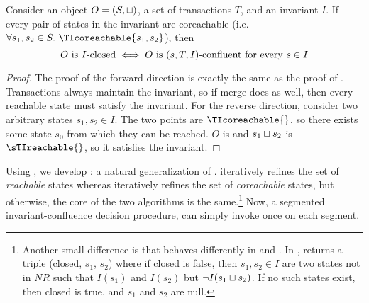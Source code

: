 \begin{theorem}
  Consider an object $O = (S, \sqcup)$, a set of transactions $T$, and an
  invariant $I$. If every pair of states in the invariant are coreachable (i.e.
  $\forall s_1, s_2 \in S.\ \TIcoreachable{s_1, s_2}$), then
  \[
    \text{$O$ is $I$-closed{}}
    \iff
    \text{$O$ is $(s, T, I)$-confluent for every $s \in I$}
  \]
\end{theorem}
\begin{proof}
  The proof of the forward direction is exactly the same as the proof of
  . Transactions always maintain the
  invariant, so if merge does as well, then every reachable state must satisfy
  the invariant.
  For the reverse direction, consider two arbitrary states $s_1, s_2 \in I$.
  The two points are $\TIcoreachable{}$, so there exists some state $s_0$ from
  which they can be reached. $O$ is \sTIconfluent{} and $s_1 \sqcup s_2$ is
  $\sTIreachable{}$, so it satisfies the invariant.
\end{proof}

Using , we develop
: a natural generalization
of .
 iteratively refines the set of
\emph{reachable} states whereas
 iteratively refines the
set of \emph{coreachable} states, but otherwise, the core of the two algorithms
is the same.\footnote{%
  Another small difference is that \IsIclosed{} behaves differently in
   and
  . In
  , \IsIclosed{} returns a
  triple (closed, $s_1$, $s_2$) where if closed is false, then $s_1, s_2 \in I$
  are two states not in $NR$ such that $I(s_1)$ and $I(s_2)$ but $\lnot I(s_1
  \sqcup s_2)$. If no such states exist, then closed is true, and $s_1$ and
  $s_2$ are null.
}
Now, a segmented invariant-confluence decision procedure, can simply invoke
 once on each segment.

